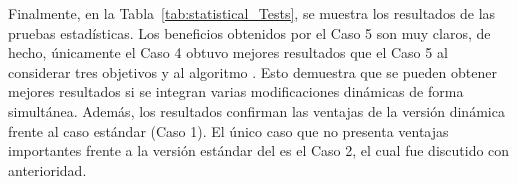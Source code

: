Finalmente, en la Tabla~\ref{tab:statistical_Tests}, se muestra los resultados de las pruebas estadísticas.
%
Los beneficios obtenidos por el Caso 5 son muy claros, de hecho,
únicamente el Caso 4 obtuvo mejores resultados que el Caso 5 al considerar tres objetivos y al algoritmo \NSGAII{}.
%
Esto demuestra que se pueden obtener mejores resultados si se integran varias modificaciones dinámicas de forma simultánea.
%
Además, los resultados confirman las ventajas de la versión dinámica frente al caso estándar (Caso 1).
%
El único caso que no presenta ventajas importantes frente a la versión estándar del \SBX{} es el Caso 2, el cual fue discutido con anterioridad.

